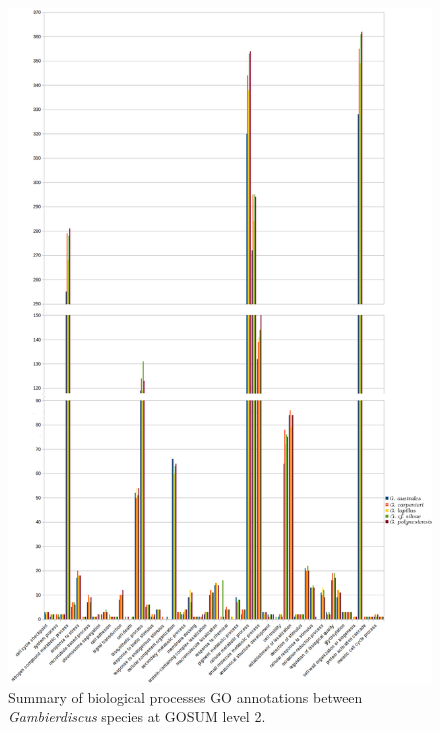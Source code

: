 \documentclass[12pt]{article}
\begin{document}
\begin{figure} 
\includegraphics[scale=.45]{3Aug18_cluster-investigation/figures/gosum-species/Species-gosum2-bio2-split.png} 
\caption{Summary of biological processes GO annotations between \textit{Gambierdiscus} species at GOSUM level 2.}%
\label{fig:SpecGo2Bio}
\end{figure} 
\end{document}
